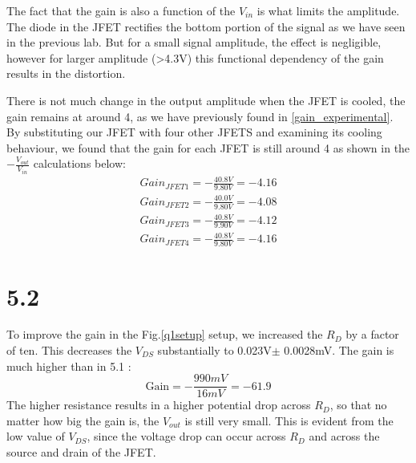 \documentclass[authoryear, 12pt,5p, times]{elsarticle}
\begin{document}
\par The fact that the gain is also a function of the $V_{in}$ is what limits the amplitude. The diode in the JFET rectifies the bottom portion of the signal as we have seen in the previous lab. But for a small signal amplitude, the effect is negligible, however for larger amplitude (>4.3V) this functional dependency of the gain results in the distortion.  
\par There is not much change in the output amplitude when the JFET is cooled, the gain remains at around 4, as we have previously found in \ref{gain_experimental}. By substituting our JFET with four other JFETS and examining its cooling behaviour, we found that the gain for each JFET is still around 4 as shown in the $- \frac{V_{out}}{V_{in}}$ calculations below: 
\begin{align*}
Gain_{JFET1}= -\frac{40.8V}{9.80V}=-4.16
\\ Gain_{JFET2}=  -\frac{40.0V}{9.80V}=-4.08
\\ Gain_{JFET3}=  -\frac{40.8V}{9.90V}=-4.12
\\ Gain_{JFET4}=  -\frac{40.8V}{9.80V}=-4.16
\end{align*}
\section*{5.2}
To improve the gain in the Fig.\ref{q1setup} setup, we increased the $R_D$ by a factor of ten. This decreases the $V_{DS}$ substantially to 0.023V$\pm$ 0.0028mV. The gain is much higher than in 5.1 :
\begin{equation}
\text{Gain} = -\frac{990mV}{16mV}= -61.9
\label{gain}
\end{equation}
The higher resistance results in a higher potential drop across  $R_D$, so that no  matter how big the gain is, the $V_{out}$ is still very small. This is evident from the low value of $V_{DS}$, since the voltage drop can occur across  $R_D$ and across the source and drain of the JFET. 
\end{document}
